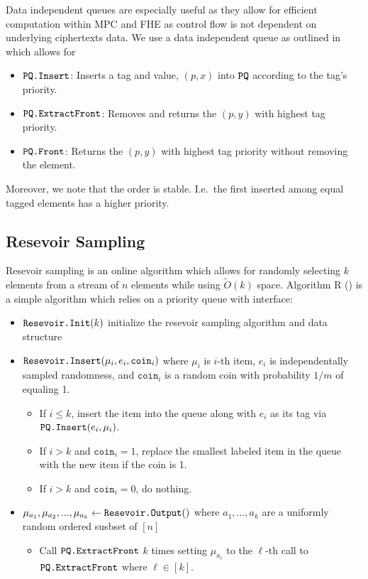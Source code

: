 Data independent queues are especially useful as they allow for efficient computation within MPC and FHE as control flow is not dependent
on underlying ciphertexts data. We use a data independent queue as outlined in \cite{mazloom2023efficient}
which allows for
\begin{itemize}
	\item $\texttt{PQ.Insert}$: Inserts a tag and value, $(p, x)$ into $\texttt{PQ}$ according to the tag's priority.
	\item $\texttt{PQ.ExtractFront}$: Removes and returns the $(p, y)$ with highest tag priority.
	\item $\texttt{PQ.Front}$: Returns the $(p, y)$ with highest tag priority without removing the element.
\end{itemize}
Moreover, we note that the order is stable. I.e.\ the first inserted among equal tagged elements has a higher priority.


\subsection{Resevoir Sampling}
Resevoir sampling is an online algorithm which allows for randomly selecting
$k$ elements from a stream of $n$ elements while using $\tilde{O}(k)$ space.
Algorithm R (\cite{vitter1985random}) is a simple algorithm which relies on a priority queue with interface:
\begin{itemize}
	\item $\texttt{Resevoir.Init}(k)$ initialize the resevoir sampling algorithm and data structure
	\item $\texttt{Resevoir.Insert}(\mu_i, e_i, \texttt{coin}_i)$ where $\mu_i$ is $i$-th item, $e_i$ is independentally sampled randomness,
	      and $\texttt{coin}_i$ is a random coin with probability $1/m$ of equaling 1.
	      \begin{itemize}
		      \item If $i \leq k$, insert the item into the queue along with $e_i$ as its tag via $\texttt{PQ.Insert}(e_i, \mu_i)$.
		      \item If $i > k$ and $\texttt{coin}_i = 1$, replace the smallest labeled item in the queue with the new item if the coin is 1.
		      \item If $i > k$ and $\texttt{coin}_i = 0$, do nothing.
	      \end{itemize}

	\item  $\mu_{a_1}, \mu_{a_2}, ..., \mu_{a_k} \gets \texttt{Resevoir.Output}()$ where $a_1, ..., a_k$ are a uniformly random ordered susbset of $[n]$
	      \begin{itemize}
		      \item Call $\texttt{PQ.ExtractFront}$ $k$ times setting $\mu_{a_\ell}$ to the $\ell$-th call to $\texttt{PQ.ExtractFront}$ where $\ell \in [k]$.
	      \end{itemize}
\end{itemize}

